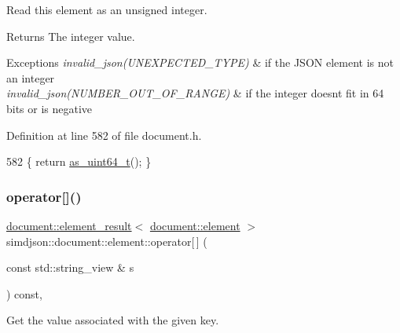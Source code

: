 Read this element as an unsigned integer. 

\begin{DoxyReturn}{Returns}
The integer value. 
\end{DoxyReturn}

\begin{DoxyExceptions}{Exceptions}
{\em invalid\+\_\+json(\+U\+N\+E\+X\+P\+E\+C\+T\+E\+D\+\_\+\+T\+Y\+P\+E)} & if the J\+S\+ON element is not an integer \\
\hline
{\em invalid\+\_\+json(\+N\+U\+M\+B\+E\+R\+\_\+\+O\+U\+T\+\_\+\+O\+F\+\_\+\+R\+A\+N\+G\+E)} & if the integer doesn\textquotesingle{}t fit in 64 bits or is negative \\
\hline
\end{DoxyExceptions}


Definition at line 582 of file document.\+h.


\begin{DoxyCode}
582 \{ \textcolor{keywordflow}{return} \hyperlink{classsimdjson_1_1document_1_1element_ab89d449ae4c78aced06643d7323cbdfb}{as\_uint64\_t}(); \}
\end{DoxyCode}
\mbox{\label{classsimdjson_1_1document_1_1element_ae7c594595c73a015d9a8bce46e52f46f}} 
\subsubsection{\texorpdfstring{operator[]()}{operator[]()}\hspace{0.1cm}{\footnotesize\ttfamily [1/2]}}
{\footnotesize\ttfamily \hyperlink{classsimdjson_1_1document_1_1element__result}{document\+::element\+\_\+result}$<$ \hyperlink{classsimdjson_1_1document_1_1element}{document\+::element} $>$ simdjson\+::document\+::element\+::operator\mbox{[}$\,$\mbox{]} (\begin{DoxyParamCaption}\item[{const std\+::string\+\_\+view \&}]{s }\end{DoxyParamCaption}) const\hspace{0.3cm}{\ttfamily [inline]}, {\ttfamily [noexcept]}}



Get the value associated with the given key. 

